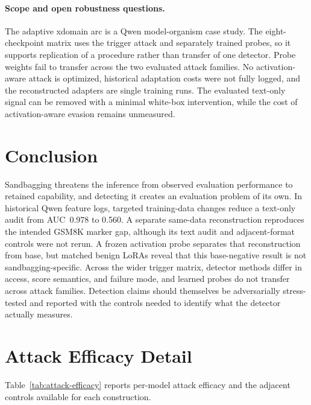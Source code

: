 \documentclass{article}
\begin{document}
\paragraph{Scope and open robustness questions.}
The adaptive xdomain arc is a Qwen model-organism case study. The eight-checkpoint matrix uses the trigger attack and separately trained probes, so it supports replication of a procedure rather than transfer of one detector. Probe weights fail to transfer across the two evaluated attack families. No activation-aware attack is optimized, historical adaptation costs were not fully logged, and the reconstructed adapters are single training runs. The evaluated text-only signal can be removed with a minimal white-box intervention, while the cost of activation-aware evasion remains unmeasured.

\section{Conclusion}
\label{sec:conclusion}

Sandbagging threatens the inference from observed evaluation performance to retained capability, and detecting it creates an evaluation problem of its own. In historical Qwen feature logs, targeted training-data changes reduce a text-only audit from AUC~0.978 to 0.560. A separate same-data reconstruction reproduces the intended GSM8K marker gap, although its text audit and adjacent-format controls were not rerun. A frozen activation probe separates that reconstruction from base, but matched benign LoRAs reveal that this base-negative result is not sandbagging-specific. Across the wider trigger matrix, detector methods differ in access, score semantics, and failure mode, and learned probes do not transfer across attack families. Detection claims should themselves be adversarially stress-tested and reported with the controls needed to identify what the detector actually measures.




\appendix

\section{Attack Efficacy Detail}
\label{app:attack}
Table~\ref{tab:attack-efficacy} reports per-model attack efficacy and the adjacent controls available for each construction.
\end{document}
